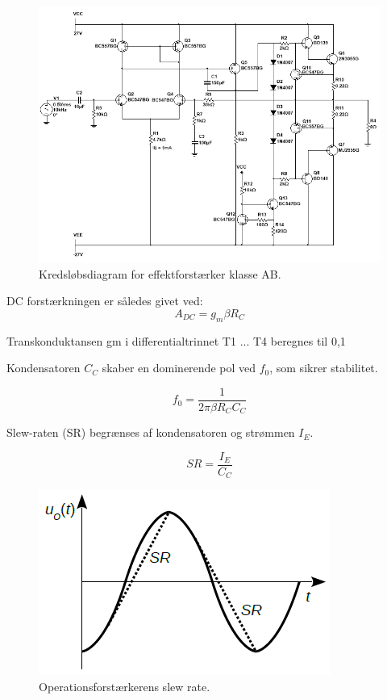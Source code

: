 \documentclass[danish]{article}
\begin{document}
\begin{figure} [H]
	\centering
	\includegraphics[width=\linewidth]{graphics/PowerAmp_schematic}
	\caption{Kredsløbsdiagram for effektforstærker klasse AB.}
	\label{fig:PowerAmp_schematic1}
\end{figure}
DC forstærkningen er således givet ved:
\begin{equation} 
A_{DC} = g_m \beta R_C
\end{equation}

Transkonduktansen gm i differentialtrinnet T1 ... T4 beregnes til 0,1 

Kondensatoren $C_C$ skaber en dominerende pol ved $f_0$, som sikrer stabilitet.

\begin{equation} 
f_0 = \dfrac{1}{2 \pi \beta R_C C_C}
\end{equation}

Slew-raten (SR) begrænses af kondensatoren og strømmen $I_E$.

\begin{equation} 
SR = \dfrac{I_E}{C_C}
\end{equation}

\begin{figure} [H]
	\centering
	\includegraphics[width=0.65\linewidth]{graphics/slewrate}
	\caption{Operationsforstærkerens slew rate.}
	\label{fig:slewrate}
\end{figure}
\end{document}
